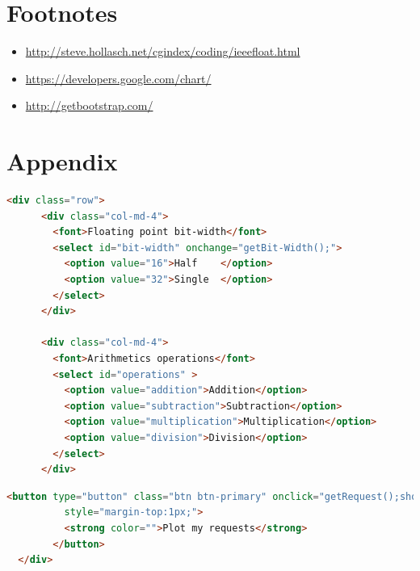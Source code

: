 \documentclass[11pt]{article}
\begin{document}
%

\section*{Footnotes}
\begin{itemize}
\item \url{http://steve.hollasch.net/cgindex/coding/ieeefloat.html}
\item \url{https://developers.google.com/chart/}
\item \url{http://getbootstrap.com/}
\end{itemize}

\newpage
\section{Appendix} \label{app:A} %
\begin{lstlisting}[label={lst:Select option}, language=HTML, caption={Select option for bit-width and arithmetic operations},]
  <div class="row">
      <div class="col-md-4">
        <font>Floating point bit-width</font>
        <select id="bit-width" onchange="getBit-Width();">      
          <option value="16">Half    </option>
          <option value="32">Single  </option>
        </select>
      </div>

      <div class="col-md-4">
        <font>Arithmetics operations</font>
        <select id="operations" > 
          <option value="addition">Addition</option>
          <option value="subtraction">Subtraction</option>
          <option value="multiplication">Multiplication</option>
          <option value="division">Division</option>
        </select>
      </div>
\end{lstlisting}


\begin{lstlisting}[label={lst:Plot my requests}, language=HTML, caption={Plot my requests button to get the value of the select option},]
        <button type="button" class="btn btn-primary" onclick="getRequest();showService();" 
          style="margin-top:1px;">
          <strong color="">Plot my requests</strong>
        </button>
  </div>      
\end{lstlisting}
\end{document}

